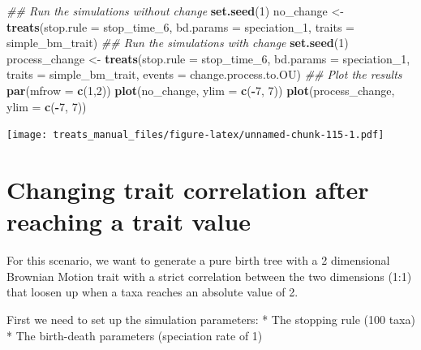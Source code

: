 \documentclass[
]{book}
\newenvironment{Shaded}{\begin{snugshade}}{\end{snugshade}}
\newcommand{\CommentTok}[1]{\textcolor[rgb]{0.56,0.35,0.01}{\textit{#1}}}
\newcommand{\DataTypeTok}[1]{\textcolor[rgb]{0.13,0.29,0.53}{#1}}
\newcommand{\DecValTok}[1]{\textcolor[rgb]{0.00,0.00,0.81}{#1}}
\newcommand{\KeywordTok}[1]{\textcolor[rgb]{0.13,0.29,0.53}{\textbf{#1}}}
\newcommand{\NormalTok}[1]{#1}
\newcommand{\OperatorTok}[1]{\textcolor[rgb]{0.81,0.36,0.00}{\textbf{#1}}}
\newcommand{\StringTok}[1]{\textcolor[rgb]{0.31,0.60,0.02}{#1}}
\begin{document}
\begin{Shaded}
\begin{Highlighting}[]
\CommentTok{\#\# Run the simulations without change}
\KeywordTok{set.seed}\NormalTok{(}\DecValTok{1}\NormalTok{)}
\NormalTok{no\_change \textless{}{-}}\StringTok{ }\KeywordTok{treats}\NormalTok{(}\DataTypeTok{stop.rule =}\NormalTok{ stop\_time\_}\DecValTok{6}\NormalTok{,}
                  \DataTypeTok{bd.params =}\NormalTok{ speciation\_}\DecValTok{1}\NormalTok{,}
                  \DataTypeTok{traits    =}\NormalTok{ simple\_bm\_trait)}
\CommentTok{\#\# Run the simulations with change}
\KeywordTok{set.seed}\NormalTok{(}\DecValTok{1}\NormalTok{)}
\NormalTok{process\_change \textless{}{-}}\StringTok{ }\KeywordTok{treats}\NormalTok{(}\DataTypeTok{stop.rule =}\NormalTok{ stop\_time\_}\DecValTok{6}\NormalTok{,}
                       \DataTypeTok{bd.params =}\NormalTok{ speciation\_}\DecValTok{1}\NormalTok{,}
                       \DataTypeTok{traits    =}\NormalTok{ simple\_bm\_trait,}
                       \DataTypeTok{events    =}\NormalTok{ change.process.to.OU)}
\CommentTok{\#\# Plot the results}
\KeywordTok{par}\NormalTok{(}\DataTypeTok{mfrow =} \KeywordTok{c}\NormalTok{(}\DecValTok{1}\NormalTok{,}\DecValTok{2}\NormalTok{))}
\KeywordTok{plot}\NormalTok{(no\_change, }\DataTypeTok{ylim =} \KeywordTok{c}\NormalTok{(}\OperatorTok{{-}}\DecValTok{7}\NormalTok{, }\DecValTok{7}\NormalTok{))}
\KeywordTok{plot}\NormalTok{(process\_change, }\DataTypeTok{ylim =} \KeywordTok{c}\NormalTok{(}\OperatorTok{{-}}\DecValTok{7}\NormalTok{, }\DecValTok{7}\NormalTok{))}
\end{Highlighting}
\end{Shaded}

\texttt{[image: treats\_manual\_files/figure-latex/unnamed-chunk-115-1.pdf]}

\hypertarget{EG_change_correlation}{%
\section{Changing trait correlation after reaching a trait value}\label{EG_change_correlation}}

For this scenario, we want to generate a pure birth tree with a 2 dimensional Brownian Motion trait with a strict correlation between the two dimensions (1:1) that loosen up when a taxa reaches an absolute value of 2.

First we need to set up the simulation parameters:
* The stopping rule (100 taxa)
* The birth-death parameters (speciation rate of 1)
\end{document}
